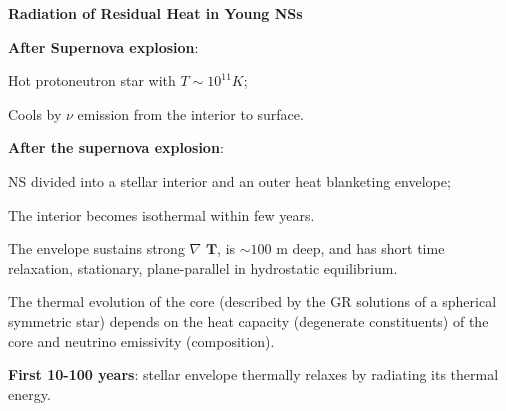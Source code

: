 

\begin{frame} 
\begin{columns}[c]
\begin{column}{0.65\textwidth} 
	{\bf \center Radiation of Residual Heat in Young NSs} 
\begin{enumerate}
\scriptsize{
	   \item {\bf After Supernova explosion}: 
	   \begin{itemize}\scriptsize{
	    \item Hot protoneutron star with $T\sim 10^{11} K$;
	    \item Cools by $\nu$ emission from the interior to surface.}
	   \end{itemize}

	   
	   \item {\bf After the supernova explosion}: 
	   \begin{itemize}\scriptsize{
	    \item NS divided into a stellar interior and an outer heat blanketing envelope;
	    \item The interior becomes isothermal within few years.
	    \item The envelope sustains strong $\nabla \textbf{ T}$, is $\sim 100$ m deep, and has short time relaxation, stationary, plane-parallel in hydrostatic equilibrium.
	      \item The thermal evolution of the core (described by the GR solutions of a spherical symmetric star) depends on the heat capacity (degenerate constituents) of the core and neutrino emissivity (composition).}
	   \end{itemize}

	  
	   \item {\bf First 10-100 years}: stellar envelope thermally relaxes by radiating its thermal energy.
	   
	   \quad
	   
}
\end{enumerate}
\end{column}
\end{columns}
\end{frame}
